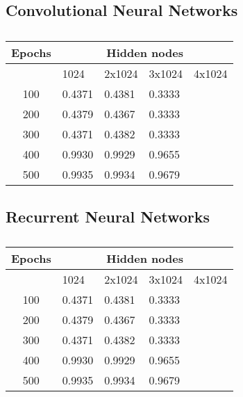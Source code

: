 \subsection{Convolutional Neural Networks}
\begin{table} [H]
	\caption{}
	\begin{tabularx}{\textwidth}{c|XXXX} \hline\hline
		\label{tab:cnn}
		\textbf{Epochs}& \multicolumn{4}{c}{\textbf{Hidden nodes}}\\ \hline
		&1024&2x1024&3x1024&4x1024\\ \hline
		
		100& 0.4371 & 0.4381 & 0.3333 & \\
		200& 0.4379 & 0.4367 & 0.3333 & \\
		300& 0.4371 & 0.4382 & 0.3333 & \\
		400& 0.9930 & 0.9929 & 0.9655 & \\
		500& 0.9935 & 0.9934 & 0.9679 & \\ \hline\hline
	\end{tabularx}
\end{table}

\subsection{Recurrent Neural Networks}
\begin{table} [H]
	\caption{}
	\begin{tabularx}{\textwidth}{c|XXXX} \hline\hline
		\label{tab:rnn}
		\textbf{Epochs}& \multicolumn{4}{c}{\textbf{Hidden nodes}}\\ \hline
		&1024&2x1024&3x1024&4x1024\\ \hline
		
		100& 0.4371 & 0.4381 & 0.3333 & \\
		200& 0.4379 & 0.4367 & 0.3333 & \\
		300& 0.4371 & 0.4382 & 0.3333 & \\
		400& 0.9930 & 0.9929 & 0.9655 & \\
		500& 0.9935 & 0.9934 & 0.9679 & \\ \hline\hline
	\end{tabularx}
\end{table}

